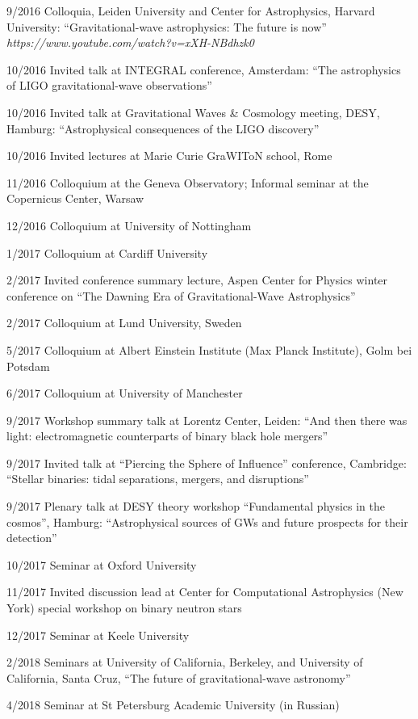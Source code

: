 \documentclass[margin,line]{res}
\begin{document}
\begin{resume}
9/2016 	Colloquia, Leiden University and Center for Astrophysics, Harvard University: ``Gravitational-wave astrophysics: The future is now'' {\it https://www.youtube.com/watch?v=xXH-NBdhzk0}

10/2016 	Invited talk at INTEGRAL conference, Amsterdam: ``The astrophysics of LIGO gravitational-wave observations''

10/2016 	Invited talk at Gravitational Waves \& Cosmology meeting, DESY, Hamburg:  ``Astrophysical consequences of the LIGO discovery''

10/2016 	Invited lectures at Marie Curie GraWIToN school, Rome

11/2016 	Colloquium at the Geneva Observatory; Informal seminar at the Copernicus Center, Warsaw 

12/2016 	Colloquium at University of Nottingham

1/2017 	Colloquium at Cardiff University

2/2017	Invited conference summary lecture, Aspen Center for Physics winter conference on ``The Dawning Era of Gravitational-Wave Astrophysics''

2/2017	Colloquium at Lund University, Sweden 

5/2017	Colloquium at Albert Einstein Institute (Max Planck Institute), Golm bei Potsdam

6/2017 	Colloquium at University of Manchester

9/2017	Workshop summary talk at Lorentz Center, Leiden: ``And then there was light: electromagnetic counterparts of binary black hole mergers''

9/2017	Invited talk at ``Piercing the Sphere of Influence'' conference, Cambridge: ``Stellar binaries: tidal separations, mergers, and disruptions''

9/2017	Plenary talk at DESY theory workshop ``Fundamental physics in the cosmos'', Hamburg: ``Astrophysical sources of GWs and future prospects for their detection''

10/2017	Seminar at Oxford University

11/2017 	Invited discussion lead at Center for Computational Astrophysics (New York) special workshop on binary neutron stars

12/2017 	Seminar at Keele University

2/2018  	Seminars at University of California, Berkeley, and University of California, Santa Cruz, ``The future of gravitational-wave astronomy''

4/2018	Seminar at St Petersburg Academic University (in Russian)


\end{resume}
\end{document}
